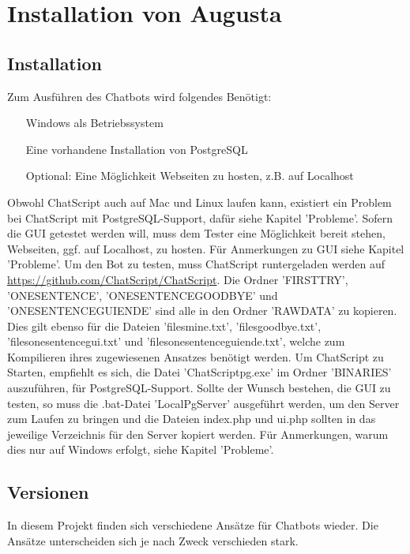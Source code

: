 \chapter{Installation von Augusta}
\label{sec:InstallationAugusta}

\section{Installation}
\label{sec:Installation}

Zum Ausführen des Chatbots wird folgendes Benötigt:

\begin{enumerate}
\item[Windows als Betriebssystem]
\item[Eine vorhandene Installation von PostgreSQL]
\item[Optional: Eine Möglichkeit Webseiten zu hosten, z.B. auf Localhost]
\end{enumerate}

Obwohl ChatScript auch auf Mac und Linux laufen kann, existiert ein Problem bei ChatScript mit PostgreSQL-Support, dafür siehe Kapitel 'Probleme'. Sofern die GUI getestet werden will, muss dem Tester eine Möglichkeit bereit stehen, Webseiten, ggf. auf Localhost, zu hosten. Für Anmerkungen zu GUI siehe Kapitel 'Probleme'. 
Um den Bot zu testen, muss ChatScript runtergeladen werden auf \url{https://github.com/ChatScript/ChatScript}. Die Ordner 'FIRSTTRY', 'ONESENTENCE', 'ONESENTENCEGOODBYE' und 'ONESENTENCEGUIENDE' sind alle in den Ordner 'RAWDATA' zu kopieren. Dies gilt ebenso für die Dateien 'filesmine.txt', 'filesgoodbye.txt', 'filesonesentencegui.txt' und 'filesonesentenceguiende.txt', welche zum Kompilieren ihres zugewiesenen Ansatzes benötigt werden. 
Um ChatScript zu Starten, empfiehlt es sich, die Datei 'ChatScriptpg.exe' im Ordner 'BINARIES' auszuführen, für PostgreSQL-Support. 
Sollte der Wunsch bestehen, die GUI zu testen, so muss die .bat-Datei 'LocalPgServer' ausgeführt werden, um den Server zum Laufen zu bringen und die Dateien index.php und ui.php sollten in das jeweilige Verzeichnis für den Server kopiert werden. 
Für Anmerkungen, warum dies nur auf Windows erfolgt, siehe Kapitel 'Probleme'. 

\section{Versionen}
\label{Versionen}

In diesem Projekt finden sich verschiedene Ansätze für Chatbots wieder. Die Ansätze unterscheiden sich je nach Zweck verschieden stark.

